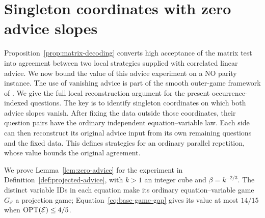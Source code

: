 \section{Singleton coordinates with zero advice slopes}
\label{sec:zero-advice}

Proposition~\ref{prop:matrix-decoding} converts high acceptance of the
matrix test into agreement between two local strategies supplied with
correlated linear advice.  We now bound the value of this advice
experiment on a NO parity instance.  The use of vanishing advice is part
of the smooth outer-game framework of
\cite[Sections~3.3--3.4]{KMS17}.  We give the full local reconstruction
argument for the present occurrence-indexed questions.  The key is to
identify singleton coordinates on which both advice slopes vanish.
After fixing the data outside those coordinates, their question pairs
have the ordinary independent equation--variable law.  Each side can
then reconstruct its original advice input from its own remaining
questions and the fixed data.  This defines strategies for an ordinary
parallel repetition, whose value bounds the original agreement.

We prove Lemma~\ref{lem:zero-advice} for the experiment in
Definition~\ref{def:projected-advice}, with $k>1$ an integer cube and
$\beta=k^{-2/3}$.  The distinct variable IDs in each equation make its
ordinary equation--variable game $G_{\mathcal E}$ a projection game;
Equation~\eqref{eq:base-game-gap} gives its value at most $14/15$ when
$\operatorname{OPT}(\mathcal E)\le4/5$.

